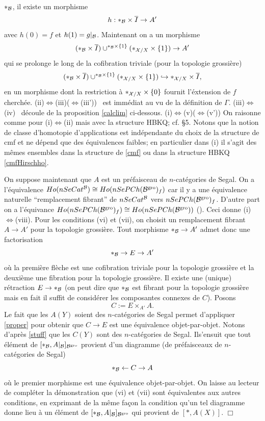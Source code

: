 \documentclass[12pt]{article}
\newcommand{\eop}{\hfill $\Box$\vspace{.1in}}
\newcommand{\Bb}{{\cal B}}
\newcommand{\Xx}{{\cal X}}
\begin{document}
$\ast_{\Bb}$, il existe un morphisme $$
h: \ast _{\Bb} \times \overline{I}\rightarrow A'
$$
avec $h(0)= f$ et $h(1)= g|_{\Bb}$. Maintenant on a un morphisme
$$
(\ast _{\Bb} \times \overline{I})\cup^{\ast _{\Bb} \times \{ 1\}}
(\ast _{\Xx /X} \times \{ 1\}) \rightarrow A'
$$
qui se prolonge le long de la cofibration triviale  (pour la topologie
grossi\`ere)
$$
(\ast _{\Bb} \times \overline{I})\cup^{\ast _{\Bb} \times \{ 1\}}
(\ast _{\Xx /X} \times \{ 1\}) \hookrightarrow
\ast _{\Xx /X} \times \overline{I},
$$
en un morphisme dont la restriction \`a $\ast _{\Xx /X} \times \{ 0\}$ fournit
l'\'extension de $f$ cherch\'ee.
\newline
(ii)$\Leftrightarrow$(iii)($\Leftrightarrow$(iii')) \, est imm\'ediat au vu de
la d\'efinition de $\Gamma$.
\newline
(iii)$\Leftrightarrow$(iv) \, d\'ecoule de la proposition \ref{calclim}
ci-dessous. \newline
(i)$\Leftrightarrow$(v)($\Leftrightarrow$(v')) On raisonne comme pour
(i)$\Leftrightarrow$(ii)  mais avec la structure HBKQ; cf. \S 5. Notons que
la notion de classe d'homotopie d'applications est ind\'ependante du choix de
la structure de cmf et ne d\'epend que des \'equivalences faibles; en
particulier dans (i) il s'agit des m\^emes ensembles dans la structure de
\ref{cmf} ou dans la structure HBKQ \ref{cmfHirschho}.

On suppose maintenant que $A$ est un pr\'efaisceau de $n$-cat\'egories de Segal.
On a l'\'equivalence $Ho(nSeCat^{\Bb})\cong Ho(nSePCh(\Bb ^{\rm gro})_f)$ car
il y a une \'equivalence naturelle ``remplacement fibrant''
de $nSeCat^{\Bb}$ vers $nSePCh(\Bb ^{\rm gro})_f$. D'autre part on a
l'\'equivance $Ho(nSePCh(\Bb ^{\rm gro})_f) \cong
Ho(nSePCh(\Bb ^{\rm gro}))$
(\cite{Quillen}). Ceci donne (i)$\Leftrightarrow$(viii).
Pour les conditions (vi) et (vii), on choisit un remplacement fibrant
$A\rightarrow A'$ pour la topologie grossi\`ere. Tout morphisme
$\ast _{\Bb}\rightarrow A'$ admet donc une factorisation
$$
\ast _{\Bb}\rightarrow E \rightarrow A'
$$
o\`u la premi\`ere fl\`eche est une cofibration triviale pour la topologie
grossi\`ere et la deuxi\`eme une fibration pour la topologie
grossi\`ere. Il existe une (unique) r\'etraction $E\rightarrow \ast _{\Bb}$
(on peut dire que $\ast _{\Bb}$ est fibrant pour la topologie grossi\`ere mais
en fait il suffit de consid\'erer les composantes connexes de $C$). Posons
$$
C:= E\times _{A'} A.
$$
Le fait que les $A(Y)$ soient des $n$-cat\'egories de Segal permet
d'appliquer \ref{proper} pour obtenir que $C\rightarrow E$ est une \'equivalence
objet-par-objet. Notons d'apr\`es \ref{stuff} que les $C(Y)$ sont des
$n$-cat\'egories de Segal. Ils'ensuit que tout \'el\'ement de $[\ast _{\Bb},
A|_{\Bb }]_{\Bb ^{\rm gro}}$ provient d'un diagramme (de pr\'efaisceaux de
$n$-cat\'egories de Segal)
$$
\ast _{\Bb}\leftarrow C
\rightarrow A
$$
o\`u le premier morphisme est une \'equivalence objet-par-objet.
On laisse au lecteur de compl\'eter la d\'emonstration que (vi) et (vii) sont
\'equivalentes aux autres conditions, en exprimant de la m\^eme fa\c{c}on la
condition qu'un tel diagramme donne lieu \`a un \'el\'ement de
$[\ast _{\Bb},
A|_{\Bb }]_{\Bb ^{\rm gro}}$ qui provient de $[\ast , A(X)]$.
\eop
\end{document}
